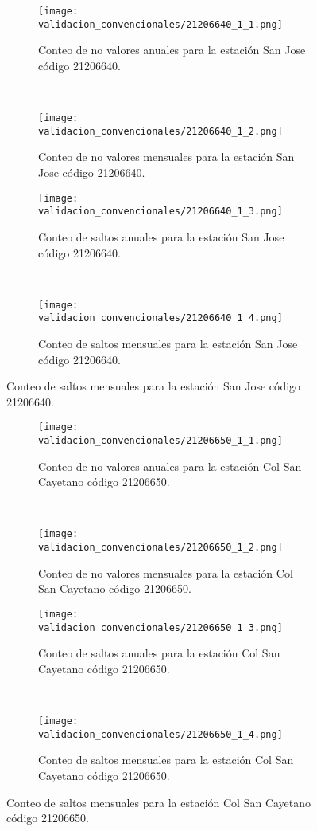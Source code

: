 \begin{figure}[H]\ContinuedFloat
\centering
	\begin{subfigure}[normla]{0.4\textwidth}
	\texttt{[image: validacion\_convencionales/21206640\_1\_1.png]}
		\caption{Conteo de no valores anuales para la estación San Jose código 21206640.}
		\label{subfig:a1}
		\end{subfigure}
		~
    \begin{subfigure}[normla]{0.4\textwidth}
	\texttt{[image: validacion\_convencionales/21206640\_1\_2.png]}
		\caption{Conteo de no valores mensuales para la estación San Jose código 21206640.}
		\label{subfig:a2}
		\end{subfigure}
		
    \begin{subfigure}[normla]{0.4\textwidth}
	\texttt{[image: validacion\_convencionales/21206640\_1\_3.png]}
		\caption{Conteo de saltos anuales para la estación San Jose código 21206640.}
		\label{subfig:a1}
		\end{subfigure}
		~
    \begin{subfigure}[normla]{0.4\textwidth}
	\texttt{[image: validacion\_convencionales/21206640\_1\_4.png]}
		\caption{Conteo de saltos mensuales para la estación San Jose código 21206640.}
		\label{subfig:a2}
		\end{subfigure}

	
\end{figure}
           
\begin{figure}[H]\ContinuedFloat
\centering
	\begin{subfigure}[normla]{0.4\textwidth}
	\texttt{[image: validacion\_convencionales/21206650\_1\_1.png]}
		\caption{Conteo de no valores anuales para la estación Col San Cayetano código 21206650.}
		\label{subfig:a1}
		\end{subfigure}
		~
    \begin{subfigure}[normla]{0.4\textwidth}
	\texttt{[image: validacion\_convencionales/21206650\_1\_2.png]}
		\caption{Conteo de no valores mensuales para la estación Col San Cayetano código 21206650.}
		\label{subfig:a2}
		\end{subfigure}
		
    \begin{subfigure}[normla]{0.4\textwidth}
	\texttt{[image: validacion\_convencionales/21206650\_1\_3.png]}
		\caption{Conteo de saltos anuales para la estación Col San Cayetano código 21206650.}
		\label{subfig:a1}
		\end{subfigure}
		~
    \begin{subfigure}[normla]{0.4\textwidth}
	\texttt{[image: validacion\_convencionales/21206650\_1\_4.png]}
		\caption{Conteo de saltos mensuales para la estación Col San Cayetano código 21206650.}
		\label{subfig:a2}
		\end{subfigure}

	
\end{figure}
           

